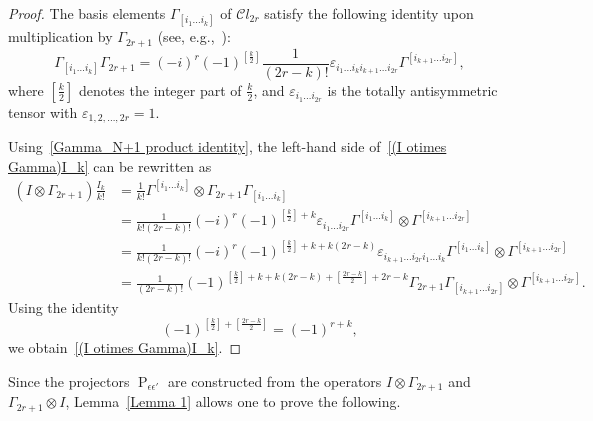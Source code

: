 \documentclass[a4paper]{article}
\newcommand{\Cl}{\mathcal{C}l}
\renewcommand{\=}{\ =\ }
\DeclareMathOperator{\proj}{P}
\numberwithin{equation}{section}
\theoremstyle{remark}
\begin{document}
\begin{proof}
The basis elements $\Gamma_{[i_1\dots i_k]}$ of $\Cl_{2r}$ satisfy the following identity upon multiplication by $\Gamma_{2r+1}$ (see, e.g.,~\cite{IsRu2}):
\begin{equation}\label{Gamma_N+1 product identity}
\Gamma_{[i_1\dots i_k]}\Gamma_{2r+1}
=
(-i)^r(-1)^{[\frac{k}{2}]}
\frac{1}{(2r-k)!}
\varepsilon_{i_1\dots i_k i_{k+1}\dots i_{2r}}
\Gamma^{[i_{k+1}\dots i_{2r}]},
\end{equation}
where $[\frac{k}{2}]$ denotes the integer part of $\frac{k}{2}$, and
$\varepsilon_{i_1\dots i_{2r}}$ is the totally antisymmetric tensor with
$\varepsilon_{1,2,\dots,2r}=1$.

Using~\eqref{Gamma_N+1 product identity}, the left-hand side of~\eqref{(I otimes Gamma)I_k} can be rewritten as
\begin{equation}
\begin{aligned}
(I\otimes \Gamma_{2r+1})\frac{I_k}{k!} &= \frac{1}{k!} \Gamma^{[i_1\dots i_k]} \otimes \Gamma_{2r+1}\Gamma_{[i_1\dots i_k]} \\
&= \frac{1}{k!(2r-k)!} (-i)^r(-1)^{[\frac{k}{2}] + k} \varepsilon_{i_1\dots i_{2r}} \Gamma^{[i_1\dots i_k]} \otimes \Gamma^{[i_{k+1}\dots i_{2r}]} \\
&= \frac{1}{k!(2r-k)!} (-i)^r(-1)^{[\frac{k}{2}] + k + k(2r-k)} \varepsilon_{i_{k+1}\dots i_{2r} i_1\dots i_k} \Gamma^{[i_1\dots i_k]} \otimes \Gamma^{[i_{k+1}\dots i_{2r}]} \\
&= \frac{1}{(2r-k)!} (-1)^{[\frac{k}{2}] + k + k(2r-k) + [\frac{2r-k}{2}] + 2r - k} \Gamma_{2r+1} \Gamma_{[i_{k+1}\dots i_{2r}]} \otimes \Gamma^{[i_{k+1}\dots i_{2r}]}.
\end{aligned}
\end{equation}
Using the identity
\begin{equation}
(-1)^{[\frac{k}{2}] + [\frac{2r-k}{2}]} = (-1)^{r+k},
\end{equation}
we obtain~\eqref{(I otimes Gamma)I_k}.
\end{proof}

Since the projectors $\proj_{\epsilon\epsilon'}$ are constructed from the operators
$I\otimes \Gamma_{2r+1}$ and $\Gamma_{2r+1}\otimes I$, Lemma~\ref{Lemma 1}
allows one to prove the following.
\end{document}
